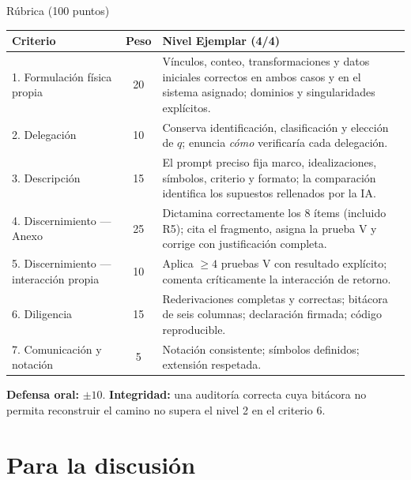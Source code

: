 \documentclass[10pt,aspectratio=169]{beamer}
\begin{document}
\begin{frame}{Rúbrica (100 puntos)}
  \scriptsize
  \begin{table}
  \begin{tabular}{@{}p{4.0cm}cp{8.2cm}@{}}
    \toprule
    \textbf{Criterio} & \textbf{Peso} & \textbf{Nivel Ejemplar (4/4)} \\
    \midrule
    1. Formulación física propia & 20 & Vínculos, conteo, transformaciones y datos iniciales correctos en ambos casos y en el sistema asignado; dominios y singularidades explícitos. \\
    2. Delegación & 10 & Conserva identificación, clasificación y elección de $q$; enuncia \emph{cómo} verificaría cada delegación. \\
    3. Descripción & 15 & El prompt preciso fija marco, idealizaciones, símbolos, criterio y formato; la comparación identifica los supuestos rellenados por la IA. \\
    4. Discernimiento --- Anexo & 25 & Dictamina correctamente los 8 ítems (incluido R5); cita el fragmento, asigna la prueba V y corrige con justificación completa. \\
    5. Discernimiento --- interacción propia & 10 & Aplica $\geq 4$ pruebas V con resultado explícito; comenta críticamente la interacción de retorno. \\
    6. Diligencia & 15 & Rederivaciones completas y correctas; bitácora de seis columnas; declaración firmada; código reproducible. \\
    7. Comunicación y notación & 5 & Notación consistente; símbolos definidos; extensión respetada. \\
    \bottomrule
  \end{tabular}
  \end{table}
  \vspace{-0.2em}
  \textbf{Defensa oral:} $\pm 10$. \quad
  \textbf{Integridad:} una auditoría correcta cuya bitácora no permita reconstruir el camino no supera el nivel 2 en el criterio 6.
\end{frame}

\section{Para la discusión}
\end{document}
